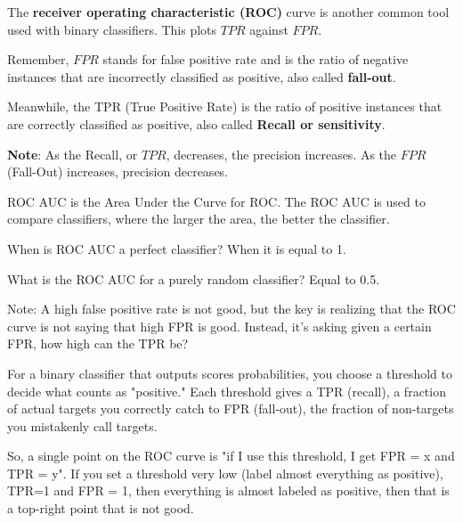 {


The \textbf{receiver operating characteristic (ROC)} curve is another common tool used with binary classifiers. This plots $TPR$ against $FPR$.

Remember, $FPR$ stands for false positive rate and is the ratio of negative instances that are incorrectly classified as positive, also called \textbf{fall-out}.


Meanwhile, the TPR (True Positive Rate) is the ratio of positive instances that are correctly classified as positive, also called \textbf{Recall or sensitivity}.



\vs
\begin{aside}
\textbf{Note}: As the Recall, or $TPR$, decreases, the precision increases. As the $FPR$ (Fall-Out) increases, precision decreases.
\end{aside}
\vs


ROC AUC is the Area Under the Curve for ROC. The ROC AUC is used to compare classifiers, where the larger the area, the better the classifier.

When is ROC AUC a perfect classifier? When it is equal to 1.

What is the ROC AUC for a purely random classifier? Equal to 0.5.

\vs
\begin{aside}
Note: A high false positive rate is not good, but the key is realizing that the ROC curve is not saying that high FPR is good. Instead, it's asking given a certain FPR, how high can the TPR be?

For a binary classifier that outputs scores probabilities, you choose a threshold to decide what counts as "positive." Each threshold gives a TPR (recall), a fraction of actual targets you correctly catch to FPR (fall-out), the fraction of non-targets you mistakenly call targets.

So, a single point on the ROC curve is "if I use this threshold, I get FPR = x and TPR = y". If you set a threshold very low (label almost everything as positive), TPR=1 and FPR = 1, then everything is almost labeled as positive, then that is a top-right point that is not good.


\end{aside}}
